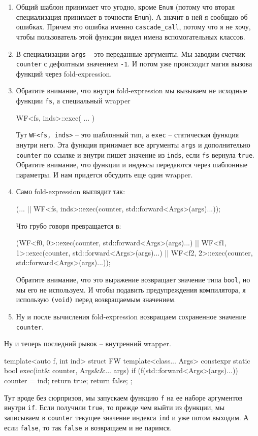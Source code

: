 \begin{enumerate}
\item Общий шаблон принимает что угодно, кроме \verb"Enum" (потому что вторая специализация принимает в точности \verb"Enum").
А значит в ней я сообщаю об ошибках.
Причем это ошибка именно \verb"cascade_call", потому что я не хочу, чтобы пользователь этой функции видел имена вспомогательных классов.

\item В специализации \verb"args" -- это переданные аргументы.
Мы заводим счетчик \verb"counter" с дефолтным значением \verb"-1".
И потом уже происходит магия вызова функций через fold-expression.

\item Обратите внимание, что внутри fold-expression мы вызываем не исходные функции \verb"fs", а специальный wrapper
\begin{cppcode}
WF<fs, inds>::exec( ... )
\end{cppcode}
Тут \verb"WF<fs, inds>" -- это шаблонный тип, а \verb"exec" -- статическая функция внутри него.
Эта функция принимает все аргументы \verb"args" и дополнительно \verb"counter" по ссылке и внутри пишет значение из \verb"inds", если \verb"fs" вернула \verb"true".
Обратите внимание, что функции и индексы передаются через шаблонные параметры.
И нам придется обсудить еще один wrapper.

\item Само fold-expression выглядит так:
\begin{cppcode}[\nonumbers]
(... || WF<fs, inds>::exec(counter, std::forward<Args>(args)...));
\end{cppcode}
Что грубо говоря превращается в:
\begin{cppcode}[\nonumbers]
(WF<f0, 0>::exec(counter, std::forward<Args>(args)...) ||
 WF<f1, 1>::exec(counter, std::forward<Args>(args)...) ||
 WF<f2, 2>::exec(counter, std::forward<Args>(args)...));
\end{cppcode}
Обратите внимание, что это выражение возвращает значение типа \verb"bool", но мы его не используем.
И чтобы подавить предупреждения компилятора, я использую \verb"(void)" перед возвращаемым значением.

\item Ну и после вычисления fold-expression возвращаем сохраненное значение \verb"counter".
\end{enumerate}
Ну и теперь последний рывок -- внутренний wrapper.
\begin{cppcode}
template<auto f, int ind>
struct FW {
  template<class... Args>
  constexpr static bool exec(int& counter, Args&&... args) {
    if (f(std::forward<Args>(args)...)) {
      counter = ind;
      return true;
    }
    return false;
  }
};
\end{cppcode}
Тут вроде без сюрпризов, мы запускаем функцию \verb"f" на ее наборе аргументов внутри \verb"if".
Если получили \verb"true", то прежде чем выйти из функции, мы записываем в \verb"counter" текущее значение индекса \verb"ind" и уже потом выходим.
А если \verb"false", то так \verb"false" и возвращаем и не паримся.

